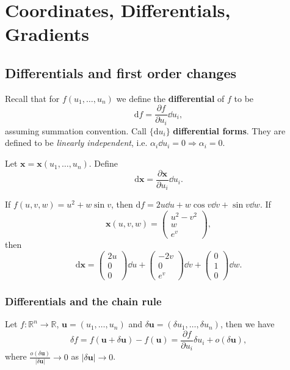 \section{Coordinates, Differentials, Gradients}
\subsection{Differentials and first order changes}

Recall that for $ f(u_1,\dots,u_n) $ we define the \textbf{differential} of $f$ to be 
\[
    \mathrm{d} f = \frac{\partial f}{\partial u_i} \dd u_i, 
\]
assuming summation convention. Call $ \{\mathrm{d} u_i\} $ \textbf{differential forms}. They are defined to be \textit{linearly independent}, i.e. $ \alpha_i \dd u_i =0 \Rightarrow \alpha_i=0 $.
\begin{definition}
    Let $\mathbf{x} = \mathbf{x}(u_1,\dots,u_n)$. Define
    \[
        \mathrm{d} \mathbf{x}= \frac{\partial \mathbf{x}}{\partial u_i} \dd u_i. 
    \]
\end{definition}

\begin{example}
    If $f(u,v,w)=u^2+w\sin v$, then $ \mathrm{d} f = 2u\dd u+w \cos v \dd v+ \sin v \dd w $. If 
    \[
        \mathbf{x}(u,v,w)=\begin{pmatrix}
            u^2-v^2 \\ w \\ e^v
        \end{pmatrix},
    \] 
    then 
    \[
        \mathrm{d} \mathbf{x} = \begin{pmatrix}
            2u \\ 0 \\ 0
        \end{pmatrix}\dd u+ \begin{pmatrix}
            -2v \\ 0 \\ e^v
        \end{pmatrix}\dd v+\begin{pmatrix}
            0 \\ 1 \\ 0
        \end{pmatrix}\dd w.
    \]
\end{example}

\subsubsection*{Differentials and the chain rule}
Let $ f: \mathbb{R}^{n}\to \mathbb{R} $, $\mathbf{u}=(u_1,\dots,u_n)$ and $ \delta\mathbf{u}=(\delta u_1,\dots,\delta u_n) $, then we have 
\[
    \delta f=f(\mathbf{u}+\delta\mathbf{u})-f(\mathbf{u})=\frac{\partial f}{\partial u_i}\delta u_i +o(\delta\mathbf{u}),
\]
where $ \frac{o(\delta\mathbf{u})}{|\delta\mathbf{u}|}\to 0 $ as $ |\delta\mathbf{u}|\to 0 $.

